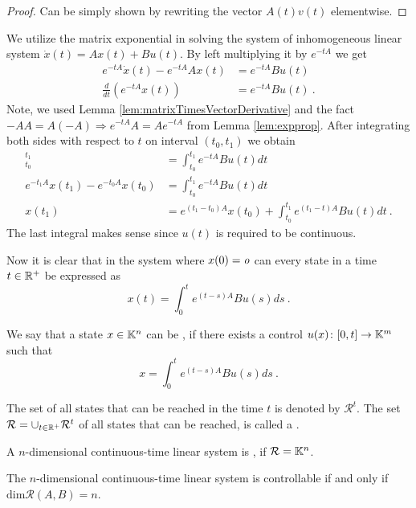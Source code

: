 \begin{proof}
	Can be simply shown by rewriting the vector $A(t)v(t)$ elementwise.
\end{proof}

We utilize the matrix exponential in solving the system of inhomogeneous linear system $\dot{x}(t)=Ax(t)+Bu(t)$. By left multiplying it by $e^{-tA}$ we get
\begin{align*}
	e^{-tA}\dot{x}(t)-e^{-tA}Ax(t) &=e^{-tA}Bu(t) \\
	\frac{d}{dt} (e^{-tA}x(t)) &=e^{-tA}Bu(t)\ .
\end{align*}
Note, we used Lemma \ref{lem:matrixTimesVectorDerivative} and the fact $-AA=A(-A)\Rightarrow e^{-tA}A=Ae^{-tA}$ from Lemma \ref{lem:expprop}. After integrating both sides with respect to $t$ on interval $(t_0,t_1)$ we obtain
\begin{align*}
	[e^{-tA}x(t)]^{t_1}_{t_0}&=\int^{t_1}_{t_0}e^{-tA}Bu(t)dt \\
	e^{-t_1A}x(t_1)-e^{-t_0A}x(t_0)&=\int^{t_1}_{t_0}e^{-tA}Bu(t)dt \\
	x(t_1)&=e^{(t_1-t_0)A}x(t_0)+\int^{t_1}_{t_0}e^{(t_1-t)A}Bu(t)dt\ .
\end{align*}
The last integral makes sense since $u(t)$ is required to be continuous.

Now it is clear that in the system where $x(0)=\textit{o}$ can every state in a time $t\in \mathbb{R}^+$ be expressed as
\begin{equation}
\label{eq:coolVzorec}
	x(t)=\int^t_0 e^{(t-s)A}Bu(s)ds\ .
\end{equation}

\begin{definition}
	We say that a state $x\in\mathbb{K}^n$ can be , if there exists a control $u(x)\colon[0,t]\rightarrow\mathbb{K}^m$ such that
	$$x=\int^t_0 e^{(t-s)A}Bu(s)ds\ .$$

	The set of all states that can be reached in the time $t$ is denoted by $\mathcal{R}^t$. The set $\mathcal{R}=\cup_{t\in\mathbb{R}^+}\mathcal{R}^t$ of all states that can be reached, is called a .
\end{definition}

\begin{definition}
	A $n$-dimensional continuous-time linear system is , if $\mathcal{R}=\mathbb{K}^n$.
\end{definition}

\begin{theorem}
	The $n$-dimensional continuous-time linear system is controllable if and only if $\text{dim}\mathcal{R}(A,B)=n$.
\end{theorem}

